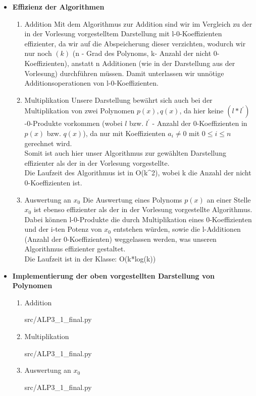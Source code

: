 \newpage
 
\begin{itemize}
	\item \textbf{Effizienz der Algorithmen} 
		\begin{enumerate}
			\item Addition
				Mit dem Algorithmus zur Addition sind wir im Vergleich zu der in der Vorlesung vorgestelltem Darstellung mit l-0-Koeffizienten effizienter, da wir auf die Abspeicherung dieser verzichten, wodurch wir nur noch $(k)$ (n - Grad des Polynoms, k- Anzahl der nicht 0- Koeffizienten), anstatt n Additionen (wie in der Darstellung aus der Vorlesung) durchführen müssen. Damit unterlassen wir unnötige Additionsoperationen von l-0-Koeffizienten. 
			\item Multiplikation
 				Unsere Darstellung bewährt sich auch bei der Multiplikation von zwei Polynomen $p(x),q(x)$, da hier keine $(l*l^')$-0-Produkte vorkommen (wobei $l$ bzw. $l^'$ - Anzahl der 0-Koeffizienten in $p(x)$ bzw. $q(x)$), da nur mit Koeffizienten $a_i \neq 0$ mit $0 \leq i \leq n$ gerechnet wird.\\
				Somit ist auch hier unser Algorithmus zur gewählten Darstellung effizienter als der in der Vorlesung vorgestellte. \\ 
				Die Laufzeit des Algorithmus ist in O(k^2), wobei k die Anzahl der nicht 0-Koeffizienten ist. 
			\item Auswertung an $x_0$
				Die Auswertung eines Polynoms $p(x)$ an einer Stelle $x_0$ ist ebenso effizienter als der in der Vorlesung vorgestellte Algorithmus. Dabei können l-0-Produkte die durch Multiplikation eines 0-Koeffizienten und der i-ten Potenz von $x_0$ entstehen würden, sowie die l-Additionen (Anzahl der 0-Koeffizienten) weggelassen werden, was unseren Algorithmus effizienter gestaltet. \\
				Die Laufzeit ist in der Klasse: O(k*log(k))
		\end{enumerate}
		
		\item \textbf{Implementierung der oben vorgestellten Darstellung von Polynomen}
		\begin{enumerate}
		  \item Addition		
														
			{src/ALP3_1_final.py}
		  \newpage	
		  \item Multiplikation
														
			{src/ALP3_1_final.py}
		  \item Auswertung an $x_0$
		  												
			{src/ALP3_1_final.py}
		\end{enumerate}
\end{itemize}
\newpage

